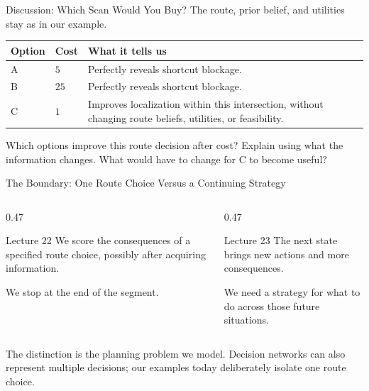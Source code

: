 \documentclass[aspectratio=169,10pt]{beamer}
\begin{document}
\begin{frame}{Discussion: Which Scan Would You Buy?}
  The route, prior belief, and utilities stay as in our example.
  \begin{center}
    \renewcommand{\arraystretch}{1.5}
    \begin{tabular}{l|l|p{}}
      \textbf{Option} & \textbf{Cost} & \textbf{What it tells us} \\\hline
      A & $5$ & Perfectly reveals shortcut blockage. \\
      B & $25$ & Perfectly reveals shortcut blockage. \\
      C & $1$ & Improves localization within this intersection, without changing route beliefs, utilities, or feasibility.
    \end{tabular}
  \end{center}
  \begin{activity}
    Which options improve this route decision after cost? Explain using what the information changes. What would have to change for C to become useful?
  \end{activity}
\end{frame}

\begin{frame}{The Boundary: One Route Choice Versus a Continuing Strategy}
  \begin{columns}[T,onlytextwidth]
    \begin{column}{0.47\textwidth}
      \begin{block}{Lecture 22}
        We score the consequences of a specified route choice, possibly after acquiring information.

        We stop at the end of the segment.
      \end{block}
    \end{column}
    \begin{column}{0.47\textwidth}
      \begin{block}{Lecture 23}
        The next state brings new actions and more consequences.

        We need a strategy for what to do across those future situations.
      \end{block}
    \end{column}
  \end{columns}
  \begin{keyidea}
    The distinction is the planning problem we model. Decision networks can also represent multiple decisions; our examples today deliberately isolate one route choice.
  \end{keyidea}
\end{frame}
\end{document}

